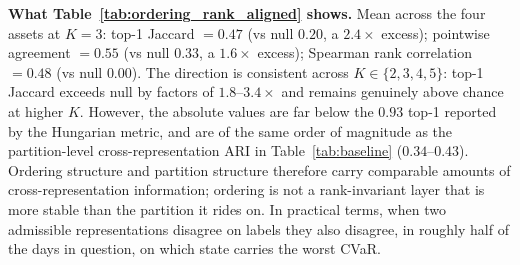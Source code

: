 \documentclass[preprint,12pt,authoryear]{elsarticle}
\begin{document}
\textbf{What Table~\ref{tab:ordering_rank_aligned} shows.}\enspace
Mean across the four assets at $K=3$: top-1 Jaccard $= 0.47$ (vs null $0.20$, a $2.4\times$ excess); pointwise agreement $= 0.55$ (vs null $0.33$, a $1.6\times$ excess); Spearman rank correlation $= 0.48$ (vs null $0.00$). The direction is consistent across $K\in\{2,3,4,5\}$: top-1 Jaccard exceeds null by factors of $1.8$--$3.4\times$ and remains genuinely above chance at higher $K$. However, the absolute values are far below the $0.93$ top-1 reported by the Hungarian metric, and are of the same order of magnitude as the partition-level cross-representation ARI in Table~\ref{tab:baseline} ($0.34$--$0.43$). Ordering structure and partition structure therefore carry comparable amounts of cross-representation information; ordering is not a rank-invariant layer that is more stable than the partition it rides on. In practical terms, when two admissible representations disagree on labels they also disagree, in roughly half of the days in question, on which state carries the worst CVaR.
\end{document}
